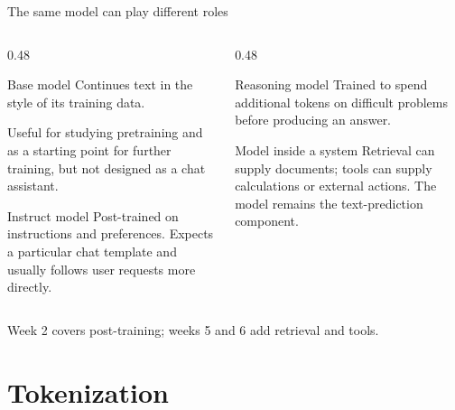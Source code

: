 \documentclass[aspectratio=169,10pt]{beamer}
\begin{document}
\begin{frame}[shrink=2]{The same model can play different roles}
  \begin{columns}[T]
    \begin{column}{0.48\textwidth}
      \begin{block}{Base model}
        Continues text in the style of its training data.
        \vspace{0.3em}

        Useful for studying pretraining and as a starting point for further
        training, but not designed as a chat assistant.
      \end{block}
      \begin{block}{Instruct model}
        Post-trained on instructions and preferences. Expects a particular
        chat template and usually follows user requests more directly.
      \end{block}
    \end{column}
    \begin{column}{0.48\textwidth}
      \begin{block}{Reasoning model}
        Trained to spend additional tokens on difficult problems before
        producing an answer.
      \end{block}
      \begin{block}{Model inside a system}
        Retrieval can supply documents; tools can supply calculations or
        external actions. The model remains the text-prediction component.
      \end{block}
    \end{column}
  \end{columns}
  \vfill
  Week 2 covers post-training; weeks 5 and 6 add retrieval and tools.
\end{frame}

\section{Tokenization}
\end{document}
